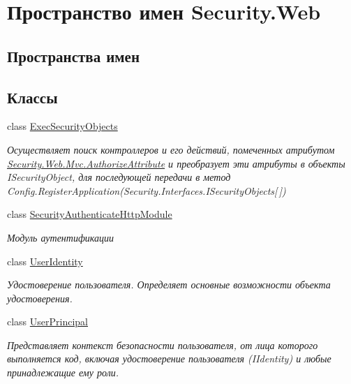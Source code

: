\hypertarget{namespace_security_1_1_web}{}\section{Пространство имен Security.\+Web}
\label{namespace_security_1_1_web}
\subsection*{Пространства имен}
\begin{DoxyCompactItemize}
\end{DoxyCompactItemize}
\subsection*{Классы}
\begin{DoxyCompactItemize}
\item 
class \hyperlink{class_security_1_1_web_1_1_exec_security_objects}{Exec\+Security\+Objects}
\begin{DoxyCompactList}\small\item\em Осуществляет поиск контроллеров и его действий, помеченных атрибутом \hyperlink{class_security_1_1_web_1_1_mvc_1_1_authorize_attribute}{Security.\+Web.\+Mvc.\+Authorize\+Attribute} и преобразует эти атрибуты в объекты I\+Security\+Object, для последующей передачи в метод Config.\+Register\+Application(\+Security.\+Interfaces.\+I\+Security\+Objects\mbox{[}$\,$\mbox{]}) \end{DoxyCompactList}\item 
class \hyperlink{class_security_1_1_web_1_1_security_authenticate_http_module}{Security\+Authenticate\+Http\+Module}
\begin{DoxyCompactList}\small\item\em Модуль аутентификации \end{DoxyCompactList}\item 
class \hyperlink{class_security_1_1_web_1_1_user_identity}{User\+Identity}
\begin{DoxyCompactList}\small\item\em Удостоверение пользователя. Определяет основные возможности объекта удостоверения. \end{DoxyCompactList}\item 
class \hyperlink{class_security_1_1_web_1_1_user_principal}{User\+Principal}
\begin{DoxyCompactList}\small\item\em Представляет контекст безопасности пользователя, от лица которого выполняется код, включая удостоверение пользователя (I\+Identity) и любые принадлежащие ему роли. \end{DoxyCompactList}\end{DoxyCompactItemize}
